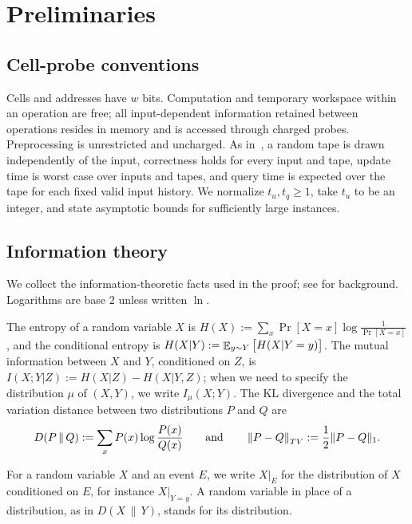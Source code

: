 \section{Preliminaries}\label{sec:prelim}

\subsection{Cell-probe conventions}\label{sec:model}

Cells and addresses have $w$ bits. Computation and temporary workspace within an operation are free; all input-dependent information retained between operations resides in memory and is accessed through charged probes. Preprocessing is unrestricted and uncharged. As in~\cite{larsen_super-logarithmic_2025}, a random tape is drawn independently of the input, correctness holds for every input and tape, update time is worst case over inputs and tapes, and query time is expected over the tape for each fixed valid input history. We normalize $t_u,t_q\ge1$, take $t_u$ to be an integer, and state asymptotic bounds for sufficiently large instances.

\subsection{Information theory}\label{sec:prelim-it}

We collect the information-theoretic facts used in the proof; see \cite{cover_elements_2006} for background. Logarithms are base $2$ unless written $\ln$.

\begin{definition}
The entropy of a random variable $X$ is $H(X) := \sum_x \Pr[X = x] \log\frac{1}{\Pr[X = x]}$, and the conditional entropy is $H(X | Y) := \mathop{\mathbb{E}}_{y \sim Y}\big[H(X | Y = y)\big]$. The mutual information between $X$ and $Y$, conditioned on $Z$, is $I(X; Y | Z) := H(X | Z) - H(X | Y, Z)$; when we need to specify the distribution $\mu$ of $(X, Y)$, we write $I_\mu(X; Y)$. The KL divergence and the total variation distance between two distributions $P$ and $Q$ are
\[ D(P \,\|\, Q) := \sum_x P(x)\log\frac{P(x)}{Q(x)} \qquad\text{and}\qquad \left\lVert P - Q\right\rVert_{TV} := \frac12\|P - Q\|_1. \]
\end{definition}

\noindent For a random variable $X$ and an event $E$, we write $X|_E$ for the distribution of $X$ conditioned on $E$, for instance $X|_{Y = y}$. A random variable in place of a distribution, as in $D(X \,\|\, Y)$, stands for its distribution.

